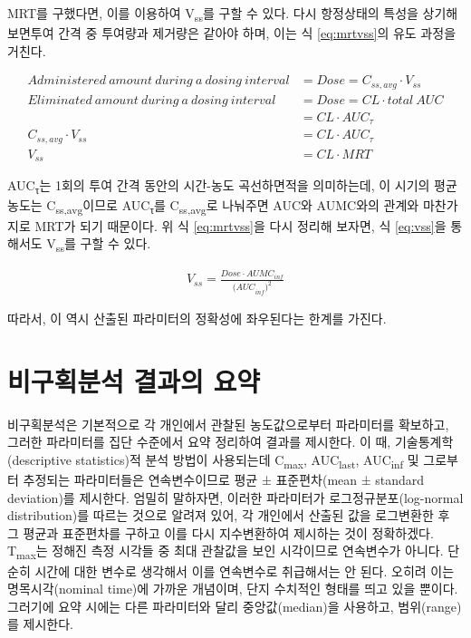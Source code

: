 \documentclass[
  11pt,
  krantz2, a4paper, twoside]{krantz}
\theoremstyle{definition}
\theoremstyle{definition}
\theoremstyle{definition}
\theoremstyle{definition}
\theoremstyle{remark}
\begin{document}
MRT를 구했다면, 이를 이용하여 V\textsubscript{ss}를 구할 수 있다. 다시 항정상태의 특성을 상기해 보면투여 간격 중 투여량과 제거량은 같아야 하며, 이는 식 \eqref{eq:mrtvss}의 유도 과정을 거친다.

\small

\begin{equation}
\begin{split}
  Administered\ amount\ during\ a\ dosing\ interval &= Dose = C_{ss,avg} \cdot V_{{ss}} \\
  Eliminated\ amount\ during\ a\ dosing\ interval &= Dose = CL \cdot total\ AUC \\
  \ \  &= CL \cdot AUC_{\tau} \\
  C_{ss,avg} \cdot V_{{ss}} &= CL \cdot AUC_{\tau} \\
  V_{{ss}} &= CL \cdot MRT
\end{split}
\label{eq:mrtvss}
\end{equation}

\normalsize

AUC\textsubscript{τ}는 1회의 투여 간격 동안의 시간-농도 곡선하면적을 의미하는데, 이 시기의 평균 농도는 C\textsubscript{ss,avg}이므로 AUC\textsubscript{τ}를 C\textsubscript{ss,avg}로 나눠주면 AUC와 AUMC와의 관계와 마찬가지로 MRT가 되기 때문이다.
위 식 \eqref{eq:mrtvss}을 다시 정리해 보자면, 식 \eqref{eq:vss}을 통해서도 V\textsubscript{ss}를 구할 수 있다.

\begin{equation}
\begin{split}
  V_{ss} = \frac{Dose \cdot AUMC_{inf}}{{{(AUC}_{inf})}^2}
\end{split}
\label{eq:vss}
\end{equation}

따라서, 이 역시 산출된 파라미터의 정확성에 좌우된다는 한계를 가진다.

\section{비구획분석 결과의 요약}\label{uxbe44uxad6cuxd68duxbd84uxc11d-uxacb0uxacfcuxc758-uxc694uxc57d}

비구획분석은 기본적으로 각 개인에서 관찰된 농도값으로부터 파라미터를 확보하고, 그러한 파라미터를 집단 수준에서 요약 정리하여 결과를 제시한다.
이 때, 기술통계학(descriptive statistics)적 분석 방법이 사용되는데 C\textsubscript{max}, AUC\textsubscript{last}, AUC\textsubscript{inf} 및 그로부터 추정되는 파라미터들은 연속변수이므로 평균 ± 표준편차(mean ± standard deviation)를 제시한다.
엄밀히 말하자면, 이러한 파라미터가 로그정규분포(log-normal distribution)를 따르는 것으로 알려져 있어, 각 개인에서 산출된 값을 로그변환한 후 그 평균과 표준편차를 구하고 이를 다시 지수변환하여 제시하는 것이 정확하겠다.
T\textsubscript{max}는 정해진 측정 시각들 중 최대 관찰값을 보인 시각이므로 연속변수가 아니다.
단순히 시간에 대한 변수로 생각해서 이를 연속변수로 취급해서는 안 된다.
오히려 이는 명목시각(nominal time)에 가까운 개념이며, 단지 수치적인 형태를 띄고 있을 뿐이다.
그러기에 요약 시에는 다른 파라미터와 달리 중앙값(median)을 사용하고, 범위(range)를 제시한다.
\end{document}
